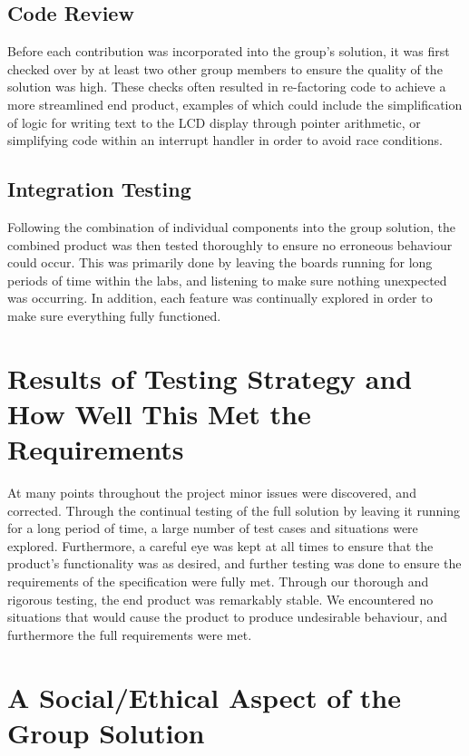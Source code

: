 \subsection*{Code Review}

Before each contribution was incorporated into the group's solution, it was 
first checked over by at least two other group members to ensure the quality of 
the solution was high. These checks often resulted in re-factoring code to 
achieve a more streamlined end product, examples of which could include the 
simplification of logic for writing text to the LCD display through pointer 
arithmetic, or simplifying code within an interrupt handler in order to avoid 
race conditions. 

\subsection*{Integration Testing}

Following the combination of individual components into the group solution, the 
combined product was then tested thoroughly to ensure no erroneous behaviour 
could occur. This was primarily done by leaving the boards running for long 
periods of time within the labs, and listening to make sure nothing unexpected 
was occurring. In addition, each feature was continually explored in order to 
make sure everything fully functioned.  

\section{Results of Testing Strategy and How Well This Met the Requirements}

At many points throughout the project minor issues were discovered, and corrected. 
Through the continual testing of the full solution by leaving it running for a 
long period of time, a large number of test cases and situations were explored.
Furthermore, a careful eye was kept at all times to ensure that the product's
functionality was as desired, and further testing was done to ensure the 
requirements of the specification were fully met.
Through our thorough and rigorous testing, the end product was remarkably stable. 
We encountered no situations that would cause the product to produce undesirable 
behaviour, and furthermore the full requirements were met.

\section{A Social/Ethical Aspect of the Group Solution} 

